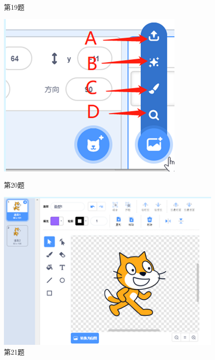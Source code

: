 \documentclass[10pt, a4paper]{article}
\begin{document}
\begin{enumerate}
\begin{figure}[htbp]
\begin{minipage}[t]{.21\textwidth}
                \caption*{第19题}
            \end{minipage}
            \begin{minipage}[t]{.23\textwidth}
                \centering
                \includegraphics[width=\textwidth]{20.png}
                \caption*{第20题}
            \end{minipage}
            \begin{minipage}[t]{.27\textwidth}
                \centering
                \includegraphics[width=\textwidth]{21.png}
                \caption*{第21题}
            \end{minipage}
        \end{figure}


\end{enumerate}
\end{document}
